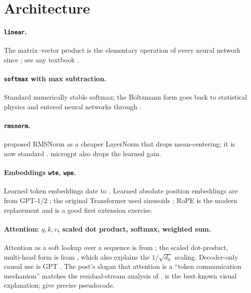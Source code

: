 \documentclass[10pt,letterpaper]{article}
\newcommand{\code}[1]{\lstinline[basicstyle=\ttfamily\small]|#1|}
\newcounter{q}
\begin{document}
\section{Architecture}

\paragraph{\code{linear}.} The matrix--vector product is the elementary operation of every neural network since \textcite{rumelhart1986learning}; see any textbook \parencite{goodfellow2016deep,bishop2006prml,prince2023understanding}.

\paragraph{\code{softmax} with max subtraction.} Standard numerically stable softmax; the Boltzmann form goes back to statistical physics and entered neural networks through \textcite{ackley1985boltzmann}.

\paragraph{\code{rmsnorm}.} \textcite{zhang2019rmsnorm} proposed RMSNorm as a cheaper LayerNorm \parencite{ba2016layernorm} that drops mean-centering; it is now standard \parencite{touvron2023llama}. microgpt also drops the learned gain.

\paragraph{Embeddings \code{wte}, \code{wpe}.} Learned token embeddings date to \textcite{bengio2003neural}. Learned absolute position embeddings are from GPT-1/2 \parencite{radford2018gpt1,radford2019gpt2}; the original Transformer used sinusoids \parencite{vaswani2017attention}; RoPE \parencite{su2021rope} is the modern replacement and is a good first extension exercise.

\paragraph{Attention: $q,k,v$, scaled dot product, softmax, weighted sum.} Attention as a soft lookup over a sequence is from \textcite{bahdanau2015attention}; the scaled dot-product, multi-head form is from \textcite{vaswani2017attention}, which also explains the $1/\sqrt{d_h}$ scaling. Decoder-only causal use is GPT \parencite{radford2018gpt1}. The post's slogan that attention is a ``token communication mechanism'' matches the residual-stream analysis of \textcite{elhage2021mathematical}. \textcite{alammar2018illustrated} is the best-known visual explanation; \textcite{phuong2022formal} give precise pseudocode.
\end{document}
